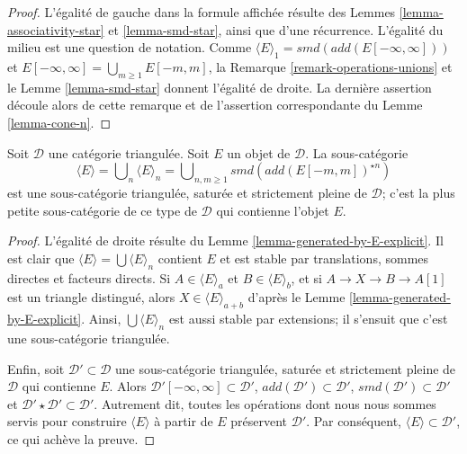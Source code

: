 \begin{proof}
L'égalité de gauche dans la formule affichée résulte des Lemmes
\ref{lemma-associativity-star} et \ref{lemma-smd-star}, ainsi que d'une
récurrence. L'égalité du milieu est une question de notation.
Comme $\langle E \rangle_1 = smd(add(E[-\infty, \infty]))$ et
$E[-\infty, \infty] = \bigcup_{m \geq 1} E[-m, m]$, la
Remarque \ref{remark-operations-unions} et le Lemme \ref{lemma-smd-star}
donnent l'égalité de droite. La dernière assertion découle alors de cette
remarque et de l'assertion correspondante du Lemme \ref{lemma-cone-n}.
\end{proof}

\begin{lemma}
\label{lemma-find-smallest-containing-E}
Soit $\mathcal{D}$ une catégorie triangulée. Soit $E$ un objet de
$\mathcal{D}$. La sous-catégorie
$$
\langle E \rangle = \bigcup\nolimits_n \langle E \rangle_n
= \bigcup\nolimits_{n, m \geq 1} smd(add(E[-m, m])^{\star n})
$$
est une sous-catégorie triangulée, saturée et strictement pleine de
$\mathcal{D}$; c'est la plus petite sous-catégorie de ce type de
$\mathcal{D}$ qui contienne l'objet $E$.
\end{lemma}

\begin{proof}
L'égalité de droite résulte du
Lemme \ref{lemma-generated-by-E-explicit}.
Il est clair que $\langle E \rangle = \bigcup \langle E \rangle_n$ contient
$E$ et est stable par translations, sommes directes et facteurs directs.
Si $A \in \langle E \rangle_a$ et $B \in \langle E \rangle_b$, et si
$A \to X \to B \to A[1]$ est un triangle distingué, alors
$X \in \langle E \rangle_{a + b}$ d'après le
Lemme \ref{lemma-generated-by-E-explicit}.
Ainsi, $\bigcup \langle E \rangle_n$ est aussi stable par extensions; il
s'ensuit que c'est une sous-catégorie triangulée.

\medskip\noindent
Enfin, soit $\mathcal{D}' \subset \mathcal{D}$ une sous-catégorie triangulée,
saturée et strictement pleine de $\mathcal{D}$ qui contienne $E$. Alors
$\mathcal{D}'[-\infty, \infty] \subset \mathcal{D}'$,
$add(\mathcal{D}') \subset \mathcal{D}'$,
$smd(\mathcal{D}') \subset \mathcal{D}'$ et
$\mathcal{D}' \star \mathcal{D}' \subset \mathcal{D}'$.
Autrement dit, toutes les opérations dont nous nous sommes servis pour
construire $\langle E \rangle$ à partir de $E$ préservent $\mathcal{D}'$.
Par conséquent, $\langle E \rangle \subset \mathcal{D}'$, ce qui achève la
preuve.
\end{proof}

